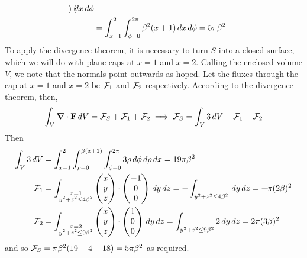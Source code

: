 \documentclass{../template/note}
\begin{document}
\begin{example*}[hard]
\begin{align*}
\begin{pmatrix}
            \end{pmatrix} \,d{x} \,d{\phi} \\
            &= \int_{x=1}^2 \int_{\phi=0}^{2\pi} \beta^2(x+1) \,d{x} \,d{\phi} = 5\pi \beta^2
        \end{align*}
        To apply the divergence theorem, it is necessary to turn \(S\) into a closed surface, which we will do with plane caps at \(x=1\) and \(x=2\). Calling the enclosed volume \(V\), we note that the normals point outwards as hoped. Let the fluxes through the cap at \(x=1\) and \(x=2\) be \(\mathcal{F}_1\) and \(\mathcal{F}_2\) respectively. According to the divergence theorem, then,
        \begin{align*}
            \int_V \div \V F \D V = \mc F_S + \mc F_1 + \mc F_2 \implies \mc F_S = \int_V 3 \D V - \mc F_1 - \mc F_2
        \end{align*}
        Then
        \begin{align*}
            \int_V 3 \,d{V} &= \int_{x=1}^2 \int_{\rho=0}^{\beta(x+1)} \int_{\phi=0}^{2\pi} 3 \rho \,d{\phi} \,d{\rho} \,d{x} = 19\pi \beta^2 \\
            \mathcal{F}_1 &= \int_{\substack{x=1 \\ y^2 + z^2 \leq 4\beta^2}} \begin{pmatrix}
             x \\
             y \\
             z \\
            \end{pmatrix} \cdot \begin{pmatrix}
             -1 \\
             0 \\
             0 \\
            \end{pmatrix} \,d{y}\,d{z} = -\int_{y^2+z^2 \leq 4\beta^2} \,d{y}\,d{z} = -\pi(2\beta)^2 \\
            \mathcal{F}_2 &= \int_{\substack{x=2 \\ y^2 + z^2 \leq 9\beta^2}} \begin{pmatrix}
             x \\
             y \\
             z \\
            \end{pmatrix} \cdot \begin{pmatrix}
             1 \\
             0 \\
             0 \\
            \end{pmatrix} \,d{y}\,d{z} = \int_{y^2+z^2 \leq 9\beta^2} 2 \,d{y}\,d{z} = 2\pi(3\beta)^2
        \end{align*}
        and so \(\mathcal{F}_S = \pi\beta^2(19+4-18) = 5\pi\beta^2\) as required.
    \end{example*}
    
\end{document}
